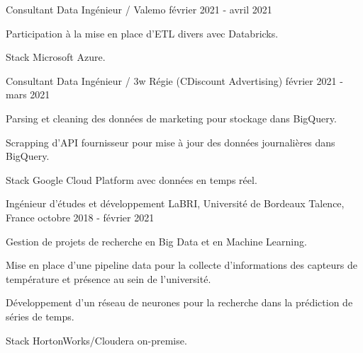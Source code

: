 \begin{cventries}
	\cventry
	{Consultant Data Ingénieur / Valemo}{}{}
	{février 2021 - avril 2021}
	{
		\begin{cvitems}
			\item Participation à la mise en place d'ETL divers avec Databricks.
			\item Stack Microsoft Azure.
		\end{cvitems}
	}
	
	\cventry
	{Consultant Data Ingénieur / 3w Régie (CDiscount Advertising)}{}{}
	{février 2021 - mars 2021}
	{
		\begin{cvitems}
			\item Parsing et cleaning des données de marketing pour stockage dans BigQuery.
			\item Scrapping d'API fournisseur pour mise à jour des données journalières dans BigQuery.
			\item Stack Google Cloud Platform avec données en temps réel.
		\end{cvitems}
	}
	
	\cventry
	{Ingénieur d'études et développement}
	{LaBRI, Université de Bordeaux}
	{Talence, France}
	{octobre 2018 - février 2021}
	{
		\begin{cvitems}
			\item Gestion de projets de recherche en Big Data et en Machine Learning.
			\item Mise en place d'une pipeline data pour la collecte d'informations des capteurs de température et présence au sein de l'université.
			\item Développement d'un réseau de neurones pour la recherche dans la prédiction de séries de temps.
			\item Stack HortonWorks/Cloudera on-premise.
		\end{cvitems}
	}
	
\end{cventries}